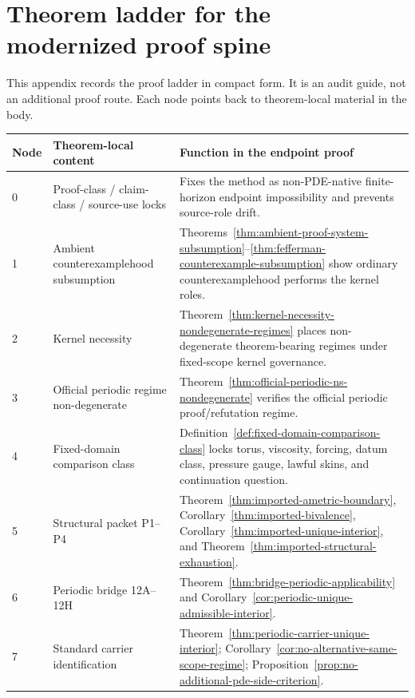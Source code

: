 \clearpage
\section{Theorem ladder for the modernized proof spine}\label{sec:ns-theorem-ladder}
This appendix records the proof ladder in compact form. It is an audit guide, not an additional proof route. Each node points back to theorem-local material in the body.

\begin{center}
\scriptsize
\renewcommand{\arraystretch}{1.13}
\setlength{\tabcolsep}{3pt}
\begin{tabularx}{0.98\textwidth}{@{}L{0.08\textwidth}L{0.27\textwidth}Y@{}}
\toprule
\textbf{Node} & \textbf{Theorem-local content} & \textbf{Function in the endpoint proof}\\
 & Proof-class / claim-class / source-use locks & Fixes the method as non-PDE-native finite-horizon endpoint impossibility and prevents source-role drift.\\
1 & Ambient counterexamplehood subsumption & Theorems~\ref{thm:ambient-proof-system-subsumption}--\ref{thm:fefferman-counterexample-subsumption} show ordinary counterexamplehood performs the kernel roles.\\
2 & Kernel necessity & Theorem~\ref{thm:kernel-necessity-nondegenerate-regimes} places non-degenerate theorem-bearing regimes under fixed-scope kernel governance.\\
3 & Official periodic regime non-degenerate & Theorem~\ref{thm:official-periodic-ns-nondegenerate} verifies the official periodic proof/refutation regime.\\
4 & Fixed-domain comparison class & Definition~\ref{def:fixed-domain-comparison-class} locks torus, viscosity, forcing, datum class, pressure gauge, lawful skins, and continuation question.\\
5 & Structural packet P1--P4 & Theorem~\ref{thm:imported-ametric-boundary}, Corollary~\ref{thm:imported-bivalence}, Corollary~\ref{thm:imported-unique-interior}, and Theorem~\ref{thm:imported-structural-exhaustion}.\\
6 & Periodic bridge 12A--12H & Theorem~\ref{thm:bridge-periodic-applicability} and Corollary~\ref{cor:periodic-unique-admissible-interior}.\\
7 & Standard carrier identification & Theorem~\ref{thm:periodic-carrier-unique-interior}; Corollary~\ref{cor:no-alternative-same-scope-regime}; Proposition~\ref{prop:no-additional-pde-side-criterion}.\\

\end{tabularx}
\end{center}
